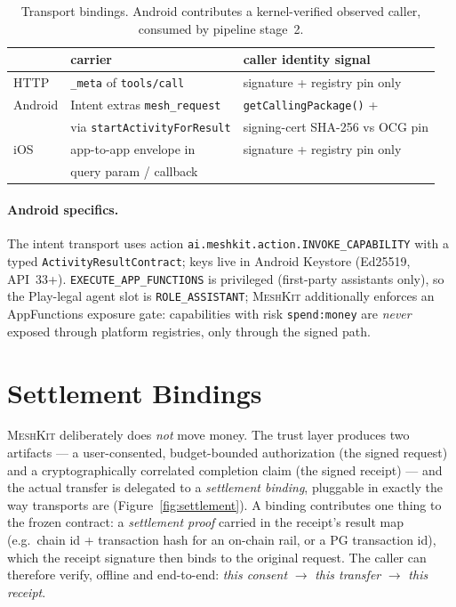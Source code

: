 \documentclass[10pt,twocolumn]{article}
\newcommand{\meshkit}{\textsc{MeshKit}}
\newcommand{\field}[1]{\texttt{#1}}
\begin{document}
\begin{table}[t]
\centering\scriptsize
\begin{tabular}{@{}lll@{}}
\toprule
 & \textbf{carrier} & \textbf{caller identity signal} \\
\midrule
HTTP & \field{\_meta} of \field{tools/call} & signature + registry pin only \\
Android & Intent extras \field{mesh\_request} & \field{getCallingPackage()} + \\
 & via \field{startActivityForResult} & signing-cert SHA-256 vs OCG pin \\
iOS & app-to-app envelope in & signature + registry pin only \\
 & query param / callback & \\
\bottomrule
\end{tabular}
\caption{Transport bindings. Android contributes a kernel-verified observed
caller, consumed by pipeline stage~2.}
\label{tab:bindings}
\end{table}

\paragraph{Android specifics.} The intent transport uses action
\field{ai.meshkit.action.INVOKE\_CAPABILITY} with a typed
\field{ActivityResultContract}; keys live in Android Keystore (Ed25519,
API~33+). \field{EXECUTE\_APP\_FUNCTIONS} is privileged
(first-party assistants only), so the Play-legal agent slot is
\field{ROLE\_ASSISTANT}; \meshkit{} additionally enforces an AppFunctions
exposure gate: capabilities with risk \field{spend:money} are \emph{never}
exposed through platform registries, only through the signed path.

\section{Settlement Bindings}
\label{sec:settlement}

\meshkit{} deliberately does \emph{not} move money. The trust layer
produces two artifacts --- a user-consented, budget-bounded authorization
(the signed request) and a cryptographically correlated completion claim
(the signed receipt) --- and the actual transfer is delegated to a
\emph{settlement binding}, pluggable in exactly the way transports are
(Figure~\ref{fig:settlement}). A binding contributes one thing to the
frozen contract: a \emph{settlement proof} carried in the receipt's result
map (e.g.\ chain id + transaction hash for an on-chain rail, or a PG
transaction id), which the receipt signature then binds to the original
request. The caller can therefore verify, offline and end-to-end:
\emph{this consent} $\rightarrow$ \emph{this transfer} $\rightarrow$
\emph{this receipt}.
\end{document}
